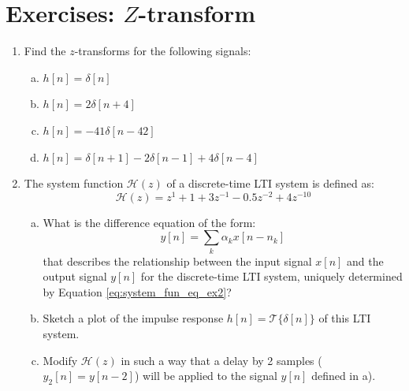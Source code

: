 \newpage
\section{Exercises: $Z$-transform}
\begin{enumerate}

  \item Find the $z$-transforms for the following signals:
        \begin{enumerate}[a)]
          \item $h[n] = \delta[n]$
          \item $h[n] = 2\delta[n+4]$
          \item $h[n] = -41\delta[n-42]$
          \item $h[n] = \delta[n+1] - 2\delta[n-1] + 4 \delta[n-4]$
        \end{enumerate}

  \item The system function $\mathcal{H}(z)$ of a discrete-time LTI system is defined as:
        \begin{equation}
          \mathcal{H}(z) = z^1 + 1 + 3z^{-1} - 0.5 z^{-2} + 4z^{-10}
          \label{eq:system_fun_eq_ex2}
        \end{equation}
        \begin{enumerate}[a)]
          \item What is the difference equation of the form:
                \begin{equation}
                  y[n] = \sum_{k} \alpha_k x[n-n_k]
                \end{equation}
                that describes the relationship between the input signal $x[n]$ and the output signal $y[n]$ for the
                discrete-time LTI system, uniquely determined by Equation \ref{eq:system_fun_eq_ex2}?
          \item Sketch a plot of the impulse response $h[n]=\mathcal{T}\{\delta[n]\}$ of this LTI system.
          \item Modify $\mathcal{H}(z)$ in such a way that a delay by 2 samples ($y_2[n]=y[n-2]$)
                will be applied to the signal $y[n]$ defined in a).
        \end{enumerate}

        \begin{marginfigure}

          \begin{center}
            \begin{tikzpicture}[node distance=3cm,auto,>=latex']


\end{tikzpicture}
\end{center}
\end{marginfigure}
\end{enumerate}
